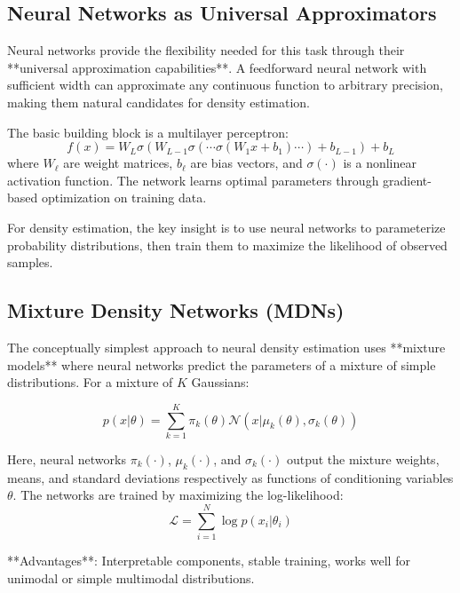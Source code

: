\documentclass[11pt,a4paper]{article}
\theoremstyle{definition}
\begin{document}
\subsection{Neural Networks as Universal Approximators}

Neural networks provide the flexibility needed for this task through their **universal approximation capabilities**. A feedforward neural network with sufficient width can approximate any continuous function to arbitrary precision, making them natural candidates for density estimation.

The basic building block is a multilayer perceptron:
\begin{equation}
    f(x) = W_L \sigma(W_{L-1} \sigma(\cdots \sigma(W_1 x + b_1) \cdots) + b_{L-1}) + b_L
\end{equation}
where $W_\ell$ are weight matrices, $b_\ell$ are bias vectors, and $\sigma(\cdot)$ is a nonlinear activation function. The network learns optimal parameters through gradient-based optimization on training data.

For density estimation, the key insight is to use neural networks to parameterize probability distributions, then train them to maximize the likelihood of observed samples.

\subsection{Mixture Density Networks (MDNs)}

The conceptually simplest approach to neural density estimation uses **mixture models** where neural networks predict the parameters of a mixture of simple distributions. For a mixture of $K$ Gaussians:

\begin{equation}
    p(x|\theta) = \sum_{k=1}^K \pi_k(\theta) \mathcal{N}(x | \mu_k(\theta), \sigma_k(\theta))
\end{equation}

Here, neural networks $\pi_k(\cdot)$, $\mu_k(\cdot)$, and $\sigma_k(\cdot)$ output the mixture weights, means, and standard deviations respectively as functions of conditioning variables $\theta$. The networks are trained by maximizing the log-likelihood:
\begin{equation}
    \mathcal{L} = \sum_{i=1}^N \log p(x_i|\theta_i)
\end{equation}

**Advantages**: Interpretable components, stable training, works well for unimodal or simple multimodal distributions.
\end{document}
